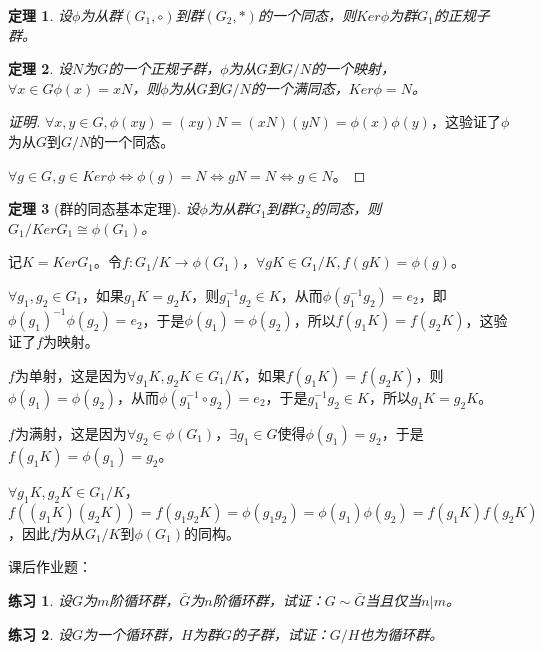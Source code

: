 \documentclass{article}
\newtheorem{Thm}{定理}
\newtheorem{Exercise}{练习}
\begin{document}
\begin{CJK*}{UTF8}{gbsn}
\begin{Thm}
  设$\phi$为从群$(G_1,\circ)$到群$(G_2,*)$的一个同态，则$Ker \phi$为群$G_1$的正规子群。
\end{Thm}

\begin{Thm}
设$N$为$G$的一个正规子群，$\phi$为从$G$到$G/N$的一个映射，$\forall x\in G \phi(x)=xN$，则$\phi$为从$G$到$G/N$的一个满同态，$Ker \phi=N$。
\end{Thm}
\begin{proof}[证明]
  $\forall x,y\in G, \phi(xy)=(xy)N=(xN)(yN)=\phi(x)\phi(y)$，这验证了$\phi$为从$G$到$G/N$的一个同态。

  $\forall g\in G, g\in Ker\phi \Leftrightarrow \phi(g)=N \Leftrightarrow gN=N \Leftrightarrow g\in N$。
\end{proof}
\begin{Thm}[群的同态基本定理]
设$\phi$为从群$G_1$到群$G_2$的同态，则$G_1/Ker G_1 \cong \phi(G_1)$。
\end{Thm}
记$K=KerG_1$。令$f:G_1/K\to \phi(G_1)$，$\forall gK\in G_1/K, f(gK)=\phi(g)$。

$\forall g_1,g_2\in G_1$，如果$g_1K=g_2K$，则$g_1^{-1}g_2\in K$，从而$\phi(g_1^{-1}g_2)=e_2$，即$\phi(g_1)^{-1}\phi(g_2)=e_2$，于是$\phi(g_1)=\phi(g_2)$，所以$f(g_1K)=f(g_2K)$，这验证了$f$为映射。

$f$为单射，这是因为$\forall g_1K,g_2K\in G_1/K$，如果$f(g_1K)=f(g_2K)$，则$\phi(g_1)=\phi(g_2)$，从而$\phi(g_1^{-1}\circ g_2)=e_2$，于是$g_1^{-1}g_2\in K$，所以$g_1K=g_2K$。

$f$为满射，这是因为$\forall g_2 \in \phi(G_1)$，$\exists g_1\in G$使得$\phi(g_1)=g_2$，于是$f(g_1K)=\phi(g_1)=g_2$。

$\forall g_1K,g_2K\in G_1/K$，$f((g_1K)(g_2K))=f(g_1g_2K)=\phi(g_1g_2)=\phi(g_1)\phi(g_2)=f(g_1K)f(g_2K)$，因此$f$为从$G_1/K$到$\phi(G_1)$的同构。

课后作业题：
\begin{Exercise}
设$G$为$m$阶循环群，$\bar{G}$为$n$阶循环群，试证：$G \sim \bar{G}$当且仅当$n | m$。
\end{Exercise}

\begin{Exercise}
设$G$为一个循环群，$H$为群$G$的子群，试证：$G/H$也为循环群。
\end{Exercise}
\end{CJK*}
\end{document}
